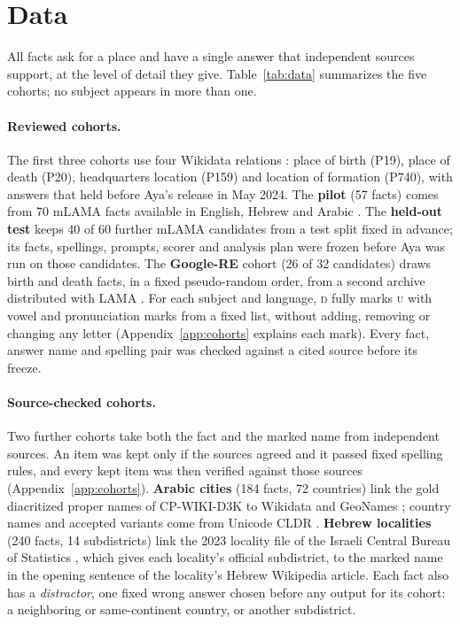 \documentclass[11pt]{article}
\newcommand{\U}{\textsc{u}}
\newcommand{\D}{\textsc{d}}
\begin{document}
\section{Data}
\label{sec:data}

All facts ask for a place and have a single answer that independent sources support, at the level of detail they give. Table~\ref{tab:data}
summarizes the five cohorts; no subject appears in more than one.

\paragraph{Reviewed cohorts.}
The first three cohorts use four Wikidata relations
\citep{vrandecic-krotzsch-2014-wikidata}: place of birth (P19), place of death
(P20), headquarters location (P159) and location of formation (P740), with
answers that held before Aya's release in May 2024. The \textbf{pilot} (57
facts) comes from 70 mLAMA facts available in English, Hebrew and Arabic
\citep{kassner-etal-2021-multilingual}. The \textbf{held-out test} keeps 40 of 60
further mLAMA candidates from a test split fixed in advance; its facts,
spellings, prompts, scorer and analysis plan were frozen before Aya was run on
those candidates. The \textbf{Google-RE} cohort (26 of 32 candidates) draws birth and death
facts, in a fixed pseudo-random order, from a second archive distributed with
LAMA \citep{petroni-etal-2019-language}. For each subject and language, \D{} fully marks \U{} with vowel and
pronunciation marks from a fixed list, without adding, removing or changing any
letter (Appendix~\ref{app:cohorts} explains each mark). Every fact, answer name and
spelling pair was checked against a cited source before its freeze.

\paragraph{Source-checked cohorts.}
Two further cohorts take both the fact and the marked name from independent
sources. An item was kept only if the sources agreed and it passed fixed spelling
rules, and every kept item was then verified against those sources
(Appendix~\ref{app:cohorts}). \textbf{Arabic cities} (184 facts, 72 countries)
link the gold diacritized proper names of CP-WIKI-D3K
\citep{bondok-etal-2025-proper} to Wikidata and GeoNames \citep{geonames-2026};
country names and accepted variants come from Unicode CLDR \citep{cldr-2026}.
\textbf{Hebrew localities} (240 facts, 14 subdistricts) link the 2023 locality
file of the Israeli Central Bureau of Statistics \citep{cbs-2023-localities},
which gives each locality's official subdistrict, to the marked name in the
opening sentence of the locality's Hebrew Wikipedia article. Each fact also has
a \emph{distractor}, one fixed wrong answer chosen before any output for its
cohort: a neighboring or same-continent country, or another subdistrict.
\end{document}
